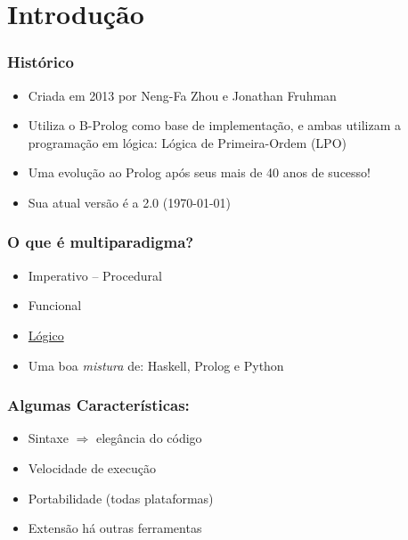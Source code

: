 



\section{Introdução}
\begin{frame}

    \frametitle{Histórico}

    \begin{itemize}
      \item Criada em 2013 por Neng-Fa Zhou e Jonathan Fruhman 

      \item Utiliza o B-Prolog como base de implementação, e ambas utilizam 
      a  programação em lógica: Lógica de Primeira-Ordem (LPO)

      \item Uma evolução ao Prolog após seus mais de 40 anos de sucesso!

      \item Sua atual versão é a 2.0 (\today)

    \end{itemize}
\end{frame}


\begin{frame}
    \frametitle{O que é multiparadigma?}

    \begin{itemize}
      \item Imperativo -- Procedural
      \item Funcional
      \item \underline{Lógico}
      \item Uma boa \textit{mistura} de: Haskell, Prolog e Python

    \end{itemize}

\end{frame}


\begin{frame}
    \frametitle{Algumas Características:}

    \begin{itemize}
    
      \item Sintaxe $\Rightarrow $ elegância do código
      \item Velocidade de execução
      \item Portabilidade (todas plataformas)
      \item Extensão há outras ferramentas
      
    \end{itemize}
\end{frame}

